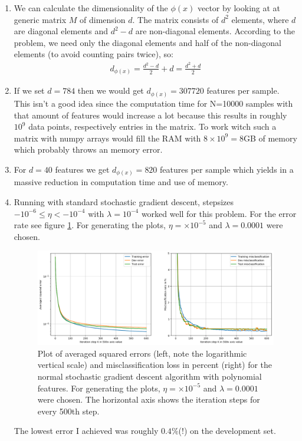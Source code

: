 \documentclass[12pt]{article}
\begin{document}
\begin{enumerate}
	\item We can calculate the dimensionality of the $\phi(x)$ vector by looking at at generic matrix $M$ of dimension $d$. The matrix consists of $d^2$ elements, where $d$ are diagonal elements and $d^2-d$ are non-diagonal elements. According to the problem, we need only the diagonal elements and half of the non-diagonal elements (to avoid counting pairs twice), so: 
	\begin{align}
		d_{\phi(x)} = \frac{d^2 - d}{2} + d = \frac{d^2+d}{2}
	\end{align}
	\item If we set $d=784$ then we would get $d_{\phi(x)}=307720$ features per sample. This isn't a good idea since the computation time for N=10000 samples with that amount of features would increase a lot because this results in roughly $10^9$ data points, respectively entries in the matrix. To work witch such a matrix with numpy arrays would fill the RAM with $8\times 10^9 = 8$GB of memory which probably throws an memory error. 
	\item For $d=40$ features we get $d_{\phi(x)}=820$ features per sample which yields in a massive reduction in computation time and use of memory. 
	\item Running with standard stochastic gradient descent, stepsizes $ -10^{-6} \leq \eta < -10^{-4} $ with $\lambda = 10^{-4}$ worked well for this problem. For the error rate see figure \ref{fig:1.5}. For generating the plots, $\eta = \times 10^{-5}$ and $\lambda=0.0001$ were chosen.
	\begin{figure}[h!]
	 	\centering
	 	\includegraphics[width=0.85\linewidth]{./Problem_1/Problem_1.5.png}
	 	\caption{Plot of averaged squared errors (left, note the logarithmic vertical scale) and misclassification loss in percent (right) for the normal stochastic gradient descent algorithm with polynomial features. For generating the plots, $\eta = \times 10^{-5}$ and $\lambda=0.0001$ were chosen. The horizontal axis shows the iteration steps for every 500th step.}
	 	\label{fig:1.5}
	\end{figure}
	The lowest error I achieved was roughly $0.4\%$(!) on the development set.
\end{enumerate}
\end{document}
